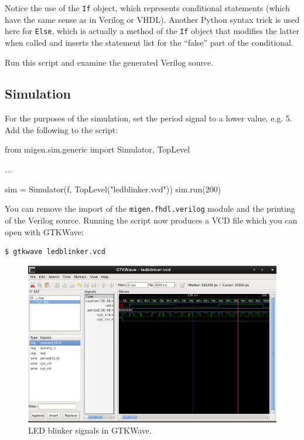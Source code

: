 \documentclass[11pt]{paper}
\begin{document}
Notice the use of the \verb!If! object, which represents conditional statements (which have the same sense as in Verilog or VHDL). Another Python syntax trick is used here for \verb!Else!, which is actually a method of the \verb!If! object that modifies the latter when called and inserts the statement list for the ``false'' part of the conditional.

Run this script and examine the generated Verilog source.


\subsection{Simulation}
For the purposes of the simulation, set the period signal to a lower value, e.g. 5. Add the following to the script:
\begin{verbatimtab}
from migen.sim.generic import Simulator, TopLevel

...

sim = Simulator(f, TopLevel("ledblinker.vcd"))
sim.run(200)
\end{verbatimtab}

You can remove the import of the \verb!migen.fhdl.verilog! module and the printing of the Verilog source. Running the script now produces a VCD file which you can open with GTKWave:
\begin{verbatim}
$ gtkwave ledblinker.vcd
\end{verbatim}

\begin{figure}[htp]
\centering
\includegraphics[width=\textwidth]{gtkwave.png}
\caption{LED blinker signals in GTKWave.}
\end{figure}
\end{document}
